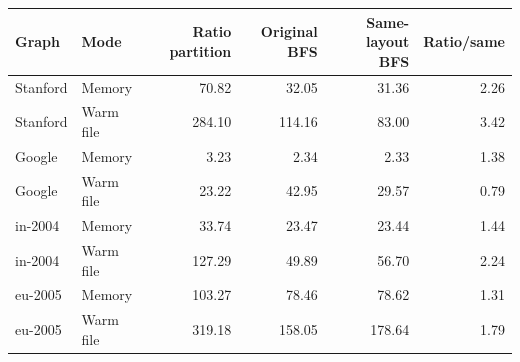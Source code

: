 \begin{tabular}{@{}llrrrr@{}}
\toprule
Graph & Mode & Ratio partition & Original BFS & Same-layout BFS & Ratio/same \\
\midrule
Stanford & Memory & 70.82 & 32.05 & 31.36 & 2.26 \\
Stanford & Warm file & 284.10 & 114.16 & 83.00 & 3.42 \\
Google & Memory & 3.23 & 2.34 & 2.33 & 1.38 \\
Google & Warm file & 23.22 & 42.95 & 29.57 & 0.79 \\
in-2004 & Memory & 33.74 & 23.47 & 23.44 & 1.44 \\
in-2004 & Warm file & 127.29 & 49.89 & 56.70 & 2.24 \\
eu-2005 & Memory & 103.27 & 78.46 & 78.62 & 1.31 \\
eu-2005 & Warm file & 319.18 & 158.05 & 178.64 & 1.79 \\
\bottomrule
\end{tabular}
